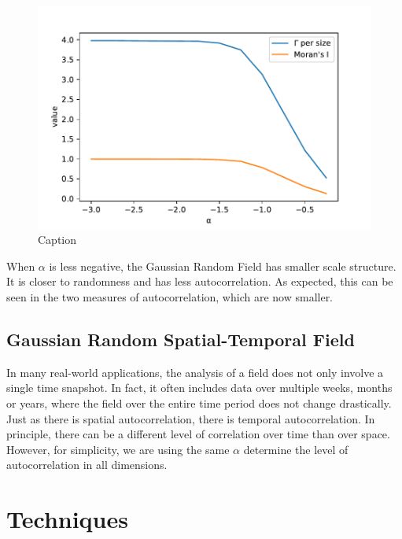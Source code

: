 \documentclass{acm_proc_article-sp}
\begin{document}
\begin{figure}[h]
\begin{center}
\includegraphics[scale=0.5]{Results/plotGammaAndMoransI.pdf}
\caption[Small caption]{Caption}
\label{fig:plotGammaAndMoransI}
\end{center}
\end{figure}

When $\alpha$ is less negative, the Gaussian Random Field has smaller scale structure. It is closer to randomness and has less autocorrelation. As expected, this can be seen in the two measures of autocorrelation, which are now smaller.

\subsection{Gaussian Random Spatial-Temporal Field}
\label{sec:Introduction Gaussian Random Spatial-Temporal Field}

In many real-world applications, the analysis of a field does not only involve a single time snapshot. In fact, it often includes data over multiple weeks, months or years, where the field over the entire time period does not change drastically. Just as there is spatial autocorrelation, there is temporal autocorrelation. In principle, there can be a different level of correlation over time than over space. However, for simplicity, we are using the same $\alpha$ determine the level of autocorrelation in all dimensions.

\section{Techniques}
\label{Techniques}
\end{document}
